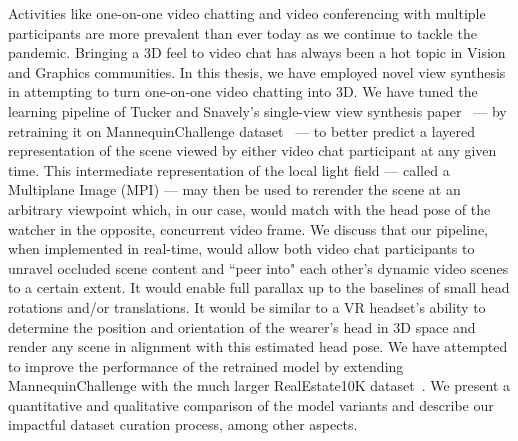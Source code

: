 Activities like one-on-one video chatting and video conferencing with multiple participants are more prevalent than ever today as we continue to tackle the pandemic. Bringing a 3D feel to video chat has always been a hot topic in Vision and Graphics communities. In this thesis, we have employed novel view synthesis in attempting to turn one-on-one video chatting into 3D. We have tuned the learning pipeline of Tucker and Snavely's single-view view synthesis paper~\cite{single_view_mpi} --- by retraining it on MannequinChallenge dataset~\cite{li2019learning} --- to better predict a layered representation of the scene viewed by either video chat participant at any given time. This intermediate representation of the local light field --- called a Multiplane Image (MPI) --- may then be used to rerender the scene at an arbitrary viewpoint which, in our case, would match with the head pose of the watcher in the opposite, concurrent video frame. We discuss that our pipeline, when implemented in real-time, would allow both video chat participants to unravel occluded scene content and ``peer into" each other's dynamic video scenes to a certain extent. It would enable full parallax up to the baselines of small head rotations and/or translations. It would be similar to a VR headset's ability to determine the position and orientation of the wearer's head in 3D space and render any scene in alignment with this estimated head pose. We have attempted to improve the performance of the retrained model by extending MannequinChallenge with the much larger RealEstate10K dataset~\cite{zhou2018stereo}. We present a quantitative and qualitative comparison of the model variants and describe our impactful dataset curation process, among other aspects.